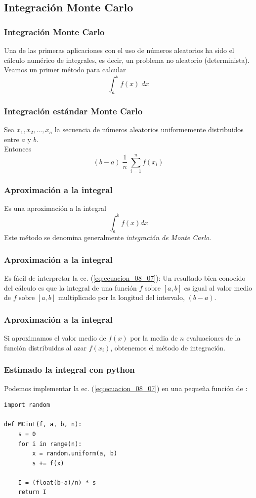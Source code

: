 \subsection{Integración Monte Carlo}
\begin{frame}
\frametitle{Integración Monte Carlo}
Una de las primeras aplicaciones con el uso de números aleatorios ha sido el cálculo numérico de integrales, es decir, un problema no aleatorio (determinista).
\\
\bigskip
Veamos un primer método para calcular
\[ \int_{a}^{b} f(x) \; d x \]
\end{frame}
\begin{frame}
\frametitle{Integración estándar Monte Carlo}
Sea $x_{1}, x_{2}, \ldots, x_{n}$ la secuencia de números aleatorios uniformemente distribuidos entre $a$ y $b$.
\\
\bigskip
Entonces
\begin{equation}
 (b - a) \; \dfrac{1}{n} \; \sum_{i=1}^{n} f(x_{i})
\label{eq:ecuacion_08_07}
\end{equation}
\end{frame}
\begin{frame}
\frametitle{Aproximación a la integral}
Es una aproximación a la integral 
\[ \int_{a}^{b} f(x) dx \]
Este método se denomina generalmente \emph{integración de Monte Carlo}.
\end{frame}
\begin{frame}
\frametitle{Aproximación a la integral}
Es fácil de interpretar la ec. (\ref{eq:ecuacion_08_07}): Un resultado bien conocido del cálculo es que la integral de una función $f$ sobre $[a, b]$ es igual al valor medio de $f$ sobre $[a, b]$ multiplicado por la longitud del intervalo, $(b - a)$.
\end{frame}
\begin{frame}
\frametitle{Aproximación a la integral}
Si aproximamos el valor medio de $f(x)$ por la media de $n$ evaluaciones de la función distribuidas al azar $f(x_{i})$, obtenemos el método de integración.
\end{frame}
\begin{frame}
\frametitle{Estimado la integral con python}
Podemos implementar la ec. (\ref{eq:ecuacion_08_07}) en una pequeña función de \python:
\begin{lstlisting}[caption=Función para la aproximar la integral, style=FormattedNumber, basicstyle=\linespread{1.1}\ttfamily=\small, columns=fullflexible]
import random

def MCint(f, a, b, n):
    s = 0
    for i in range(n):
        x = random.uniform(a, b)
        s += f(x)
        
    I = (float(b-a)/n) * s
    return I
\end{lstlisting}
\end{frame}
